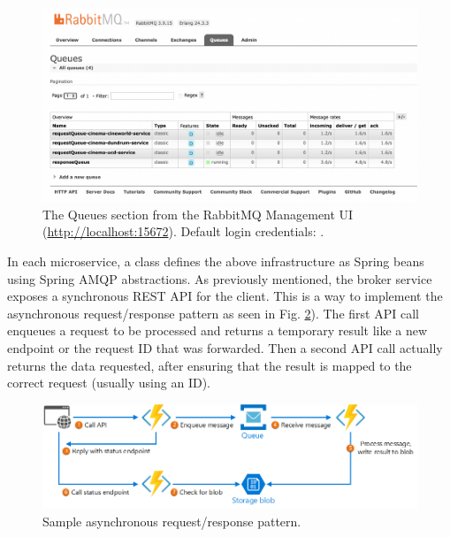 \begin{figure}[H]
  \centering
  \includegraphics[width=1.0\linewidth]{./assets/images/case-study-02/rmq-management.png}
  \caption{The Queues section from the RabbitMQ Management UI (\url{http://localhost:15672}). Default login credentials: .}
  \label{fig:rmq-management}
\end{figure}

In each microservice, a   class defines the above infrastructure as Spring beans using Spring AMQP abstractions. As previously mentioned, the broker service exposes a synchronous REST API for the client. This is a way to implement the asynchronous request/response pattern as seen in Fig. \ref{fig:async-req-res}). The first API call enqueues a request to be processed and returns a temporary result like a new endpoint or the request ID that was forwarded. Then a second API call actually returns the data requested, after ensuring that the result is mapped to the correct request (usually using an ID).

\begin{figure}[H]
  \centering
  \includegraphics[width=0.8\linewidth]{./assets/images/case-study-02/async-req-res.png}
  \caption{Sample asynchronous request/response pattern.}
  \label{fig:async-req-res}
\end{figure}

